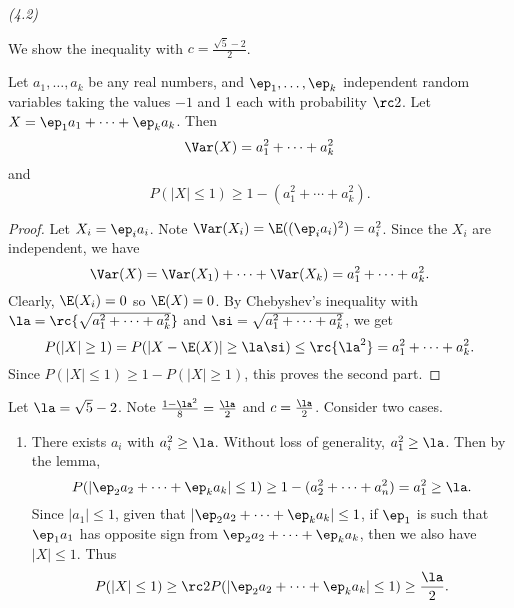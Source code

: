 \begin{problem} {\it (4.2)}

We show the inequality with $c=\frac{\sqrt{5}-2}{2}$.
\begin{lem}
Let $a_1,\ldots, a_k$ be any real numbers, and $\ep_1,\ldots, \ep_k$ independent random variables taking the values $-1$ and 1 each with probability $\rc2$. Let $X=\ep_1a_1+\cdots +\ep_ka_k$. Then
\[
\Var(X)=a_1^2+\cdots +a_k^2
\]
and
\[
P(|X|\le 1)\ge 1-(a_1^2+\cdots +a_k^2).
\]
\end{lem}
\begin{proof}
Let $X_i=\ep_ia_i$. Note $\Var(X_i)=\E((\ep_ia_i)^2)=a_i^2$. 
Since the $X_i$ are independent, we have
\[
\Var(X)=\Var(X_1)+\cdots +\Var(X_k)=a_1^2+\cdots +a_k^2.
\]
Clearly, $\E(X_i)=0$ so $\E(X)=0$. By Chebyshev's inequality with $\la=\rc{\sqrt{a_1^2+\cdots +a_k^2}}$ and $\si=\sqrt{a_1^2+\cdots +a_k^2}$, we get
\[
P(|X|\ge 1)=P(|X-\E(X)|\ge \la \si)\le \rc{\la^2}= a_1^2+\cdots +a_k^2.
\]
Since $P(|X|\le 1)\ge 1-P(|X|\ge 1)$, this proves the second part.
\end{proof}

Let $\la=\sqrt 5-2$. Note %
$\frac{1-\la^2}{8}=\frac{\la}{2}$ and $c=\frac{\la}{2}$. Consider two cases.
\begin{enumerate}
\item
There exists $a_i$ with $a_i^2\ge \la$. Without loss of generality, $a_1^2\ge \la$. Then %
by the lemma,
\[
P(|\ep_2a_2+\cdots +\ep_ka_k|\le 1)%
\ge 1-(a_2^2+\cdots +a_n^2)=a_1^2\ge \la.
\]
Since $|a_1|\le 1$, given that $|\ep_2a_2+\cdots +\ep_ka_k|\le 1$, if $\ep_1$ is such that $\ep_1a_1$ has opposite sign from $\ep_2a_2+\cdots +\ep_ka_k$, then we also have $|X|\le 1$. Thus
\[
P(|X|\le 1)\ge\rc 2P(|\ep_2a_2+\cdots +\ep_ka_k|\le 1)\ge\frac{\la}{2}.
\]


\end{enumerate}
\end{problem}
